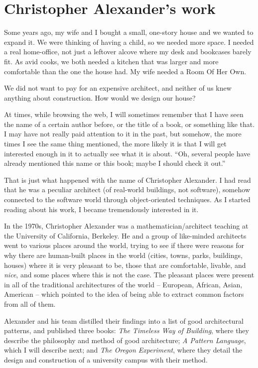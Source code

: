 \section*{Christopher Alexander's work}

Some years ago, my wife and I bought a small, one-story house and we wanted to
expand it. We were thinking of having a child, so we needed more space. I needed
a real home-office, not just a leftover alcove where my desk and bookcases
barely fit. As avid cooks, we both needed a kitchen that was larger and more
comfortable than the one the house had. My wife needed a Room Of Her Own.

We did not want to pay for an expensive architect, and neither of us knew
anything about construction. How would we design our house?

At times, while browsing the web, I will sometimes remember that I have seen the
name of a certain author before, or the title of a book, or something like that.
I may have not really paid attention to it in the past, but somehow, the more
times I see the same thing mentioned, the more likely it is that I will get
interested enough in it to actually see what it is about. ``Oh, several people
have already mentioned this name or this book; maybe I should check it out.''

That is just what happened with the name of Christopher Alexander. I had read
that he was a peculiar architect (of real-world buildings, not software),
somehow connected to the software world through object-oriented techniques. As I
started reading about his work, I became tremendously interested in it.

In the 1970s, Christopher Alexander was a mathematician/architect teaching at
the University of California, Berkeley. He and a group of like-minded architects
went to various places around the world, trying to see if there were reasons for
why there are human-built places in the world (cities, towns, parks, buildings,
houses) where it is very pleasant to be, those that are comfortable, livable,
and \textit{nice}, and some places where this is not the case. The pleasant
places were present in all of the traditional architectures of the world --
European, African, Asian, American -- which pointed to the idea of being able to
extract common factors from all of them.

Alexander and his team distilled their findings into a list of good
architectural patterns, and published three books: \textit{The Timeless Way of
Building}, where they describe the philosophy and method of good architecture;
\textit{A Pattern Language}, which I will describe next; and \textit{The Oregon
Experiment}, where they detail the design and construction of a university
campus with their method.

